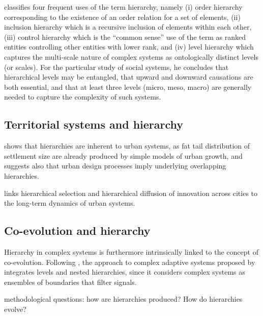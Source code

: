 \documentclass[english,fleqn,allpages]{ISTE_science}[2018/07/30]
\begin{document}
\cite{lane2006hierarchy} classifies four frequent uses of the term hierarchy, namely (i) order hierarchy corresponding to the existence of an order relation for a set of elements, (ii) inclusion hierarchy which is a recursive inclusion of elements within each other, (iii) control hierarchy which is the ``common sense'' use of the term as ranked entities controlling other entities with lower rank, and (iv) level hierarchy which captures the multi-scale nature of complex systems as ontologically distinct levels (or scales). For the particular study of social systems, he concludes that hierarchical levels may be entangled, that upward and downward causations are both essential, and that at least three levels (micro, meso, macro) are generally needed to capture the complexity of such systems.


\subsection{Territorial systems and hierarchy}


\cite{batty2006hierarchy} shows that hierarchies are inherent to urban systems, as fat tail distribution of settlement size are already produced by simple models of urban growth, and suggests also that urban design processes imply underlying overlapping hierarchies.

\cite{pumain2006alternative} links hierarchical selection and hierarchical diffusion of innovation across cities to the long-term dynamics of urban systems.




\subsection{Co-evolution and hierarchy}



Hierarchy in complex systems is furthermore intrinsically linked to the concept of co-evolution. Following \cite{lane2006hierarchy}, the approach to complex adaptive systems proposed by \cite{holland2012signals} integrates levels and nested hierarchies, since it considers complex systems as ensembles of boundaries that filter signals. 

\cite{pumain2006introduction} methodological questions: how are hierarchies produced? How do hierarchies evolve? %
\end{document}
